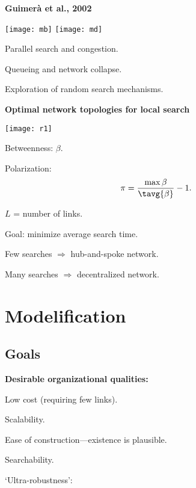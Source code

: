   \textbf{Guimer\`{a} et al., 2002\cite{guimera2002b}}
  \begin{center}
    \texttt{[image: mb]}
    \texttt{[image: md]}
    
    
      Parallel search and congestion.
    
      Queueing and network collapse.
     
      Exploration of random search mechanisms.
    
  \end{center}
  


  \textbf{Optimal network topologies for local search}

      
    \texttt{[image: r1]}
    
    
    
      Betweenness: $\beta$.
    
      Polarization: 
      $$\pi = \frac{\max \beta}{\tavg{\beta}}-1.$$
    
      $L$ = number of links.
    
  
  \bigskip


  
   
    Goal: minimize average search time.
   
    Few searches $\Rightarrow$ hub-and-spoke network.
   
    Many searches $\Rightarrow$ decentralized network.
  


\section{Modelification}

\subsection{Goals}

  \textbf{Desirable organizational qualities:}

  
    
    
      Low cost (requiring few links).
    
      Scalability.
    
      Ease of construction---existence is plausible.
    
      Searchability.
     
      \alert{`Ultra-robustness'}:
      
